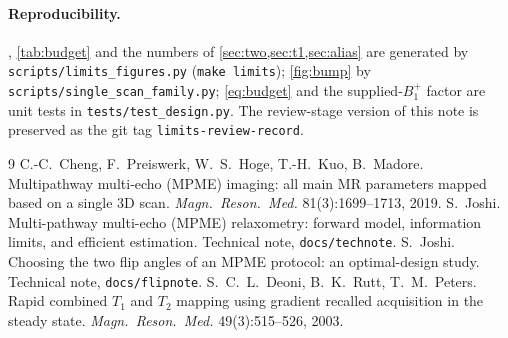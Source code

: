 \documentclass[11pt]{article}
\newcommand{\Bone}{B_1^{+}}
\begin{document}
\paragraph{Reproducibility.} , \cref{tab:budget} and the numbers of
\cref{sec:two,sec:t1,sec:alias} are generated by \texttt{scripts/limits\_figures.py}
(\texttt{make limits}); \cref{fig:bump} by \texttt{scripts/single\_scan\_family.py}; \eqref{eq:budget} and the
supplied-$\Bone$ factor are unit tests in \texttt{tests/test\_design.py}. The
review-stage version of this note is preserved as the git tag \texttt{limits-review-record}.

\begin{thebibliography}{9}
 C.-C.~Cheng, F.~Preiswerk, W.~S.~Hoge, T.-H.~Kuo, B.~Madore.
  Multipathway multi-echo (MPME) imaging: all main MR parameters mapped based on a single
  3D scan. \emph{Magn.\ Reson.\ Med.} 81(3):1699--1713, 2019.
 S.~Joshi. Multi-pathway multi-echo (MPME) relaxometry: forward model,
  information limits, and efficient estimation. Technical note, \texttt{docs/technote}.
 S.~Joshi. Choosing the two flip angles of an MPME protocol: an optimal-design
  study. Technical note, \texttt{docs/flipnote}.
 S.~C.~L.~Deoni, B.~K.~Rutt, T.~M.~Peters. Rapid combined $T_1$ and $T_2$
  mapping using gradient recalled acquisition in the steady state. \emph{Magn.\ Reson.\ Med.}
  49(3):515--526, 2003.
\end{thebibliography}
\end{document}
